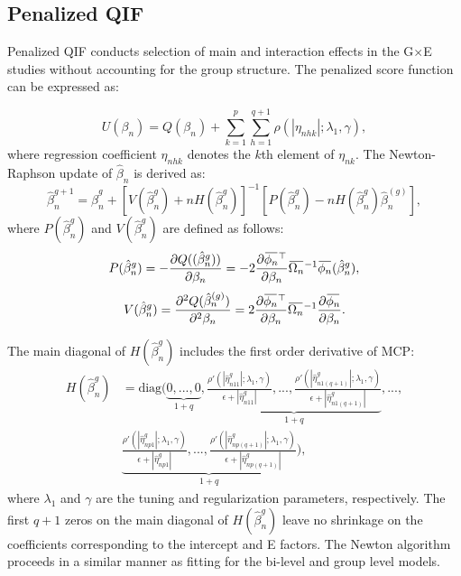 \documentclass[12pt]{article}
\newcommand{\overbar}[1]{\mkern 1.5mu\overline{\mkern-1.5mu#1\mkern-1.5mu}\mkern 1.5mu}
\begin{document}
\subsection{Penalized QIF}

Penalized QIF conducts selection of main and interaction effects in the G$\times$E studies without accounting for the group structure. The penalized score function can be expressed as:

\begin{equation*}
	U(\beta_n)=Q(\beta_n)+\sum_{k=1}^{p} \sum_{h=1}^{q+1}\rho  (|\eta_{nhk}|;\lambda_{1},\gamma),
\end{equation*}
where  regression coefficient $\eta_{nhk}$ denotes the $k$th element of $\eta_{nk}$.  The Newton-Raphson update of $\hat{\beta}_n$ is derived as:
\begin{equation*}
	\hat{\beta}_{n}^{g+1}=\hat{\beta}_{n}^{g}+[V(\hat{\beta}_{n}^{g})+nH(\hat{\beta}_{n}^{g})]^{-1}[P(\hat{\beta}_{n}^{g})-nH(\hat{\beta}_{n}^{g})\hat{\beta}_{n}^{(g)}],
\end{equation*}
where  $P(\hat{\beta}_{n}^{g})$ and $V(\hat{\beta}_{n}^{g})$ are defined as follows:
\begin{equation*}
P(\hat{\beta}_{n}^{g})=-\frac{\partial Q((\hat{\beta}_{n}^{g}))}{\partial \beta_n}=-2\frac{\partial \overbar{\phi_n}^\top}{\partial \beta_n} \overbar{\Omega_n}^{-1}\overbar{\phi_n}(\hat{\beta}_{n}^{g}),
\end{equation*}
\begin{equation*}
V(\hat{\beta}_{n}^{g})=\frac{\partial^2 Q(\hat{\beta}_{n}^{(g)})}{\partial^2 \beta_n}=2\frac{\partial \overbar{\phi_n}^\top}{\partial \beta_n} \overbar{\Omega_n}^{-1}\frac{\partial \overbar{\phi_n}}{\partial \beta_n}.
\end{equation*}

The main diagonal of $H(\hat{\beta}_{n}^{g})$ includes the first order derivative of MCP:
\begin{equation*}
	\begin{aligned}
		H(\hat{\beta}_{n}^{g})&=\text{diag}(\underbrace{0,...,0}_{1+q}, \underbrace{\frac{\rho'(|\hat{\eta}_{n11}^{g}|;\lambda_{1},\gamma)}{\epsilon+|\hat{\eta}_{n11}^{g}|},...,\frac{\rho'(|\hat{\eta}_{n1(q+1)}^{g}|;\lambda_{1},\gamma)}{\epsilon+|\hat{\eta}_{n1(q+1)}^{g}|}}_{1+q},...,\\ &\underbrace{\frac{\rho'(|\hat{\eta}_{np1}^{g}|;\lambda_{1},\gamma)}{\epsilon+|\hat{\eta}_{np1}^{g}|},...,\frac{\rho'(|\hat{\eta}_{np(q+1)}^{g}|;\lambda_{1},\gamma)}{\epsilon+|\hat{\eta}_{np(q+1)}^{g}|}}_{1+q}),
	\end{aligned}
\end{equation*}
where $\lambda_1$ and $\gamma$ are the tuning and regularization parameters, respectively. The first $q+1$ zeros on the main diagonal of $H(\hat{\beta}_{n}^{g})$ leave no shrinkage on the coefficients corresponding to the intercept and E factors. The Newton algorithm proceeds in a similar manner as fitting for the bi-level and group level models.   
\end{document}
